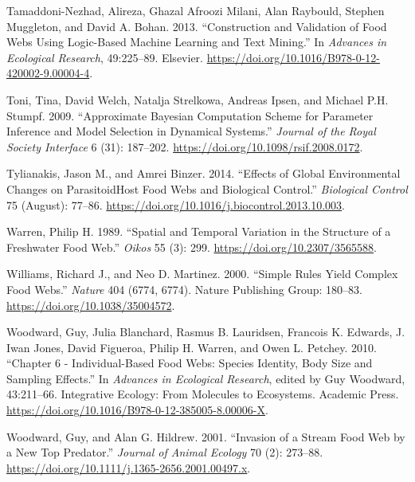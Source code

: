 \documentclass{article}
\begin{document}
\leavevmode\hypertarget{ref-tamaddoni-nezhadConstructionValidationFood2013}{}%
Tamaddoni-Nezhad, Alireza, Ghazal Afroozi Milani, Alan Raybould, Stephen
Muggleton, and David A. Bohan. 2013. ``Construction and Validation of
Food Webs Using Logic-Based Machine Learning and Text Mining.'' In
\emph{Advances in Ecological Research}, 49:225--89. Elsevier.
\url{https://doi.org/10.1016/B978-0-12-420002-9.00004-4}.

\leavevmode\hypertarget{ref-toniApproximateBayesianComputation2009}{}%
Toni, Tina, David Welch, Natalja Strelkowa, Andreas Ipsen, and Michael
P.H. Stumpf. 2009. ``Approximate Bayesian Computation Scheme for
Parameter Inference and Model Selection in Dynamical Systems.''
\emph{Journal of the Royal Society Interface} 6 (31): 187--202.
\url{https://doi.org/10.1098/rsif.2008.0172}.

\leavevmode\hypertarget{ref-tylianakisEffectsGlobalEnvironmental2014}{}%
Tylianakis, Jason M., and Amrei Binzer. 2014. ``Effects of Global
Environmental Changes on ParasitoidHost Food Webs and Biological
Control.'' \emph{Biological Control} 75 (August): 77--86.
\url{https://doi.org/10.1016/j.biocontrol.2013.10.003}.

\leavevmode\hypertarget{ref-warrenSpatialTemporalVariation1989}{}%
Warren, Philip H. 1989. ``Spatial and Temporal Variation in the
Structure of a Freshwater Food Web.'' \emph{Oikos} 55 (3): 299.
\url{https://doi.org/10.2307/3565588}.

\leavevmode\hypertarget{ref-williamsSimpleRulesYield2000}{}%
Williams, Richard J., and Neo D. Martinez. 2000. ``Simple Rules Yield
Complex Food Webs.'' \emph{Nature} 404 (6774, 6774). Nature Publishing
Group: 180--83. \url{https://doi.org/10.1038/35004572}.

\leavevmode\hypertarget{ref-woodwardChapterIndividualBasedFood2010}{}%
Woodward, Guy, Julia Blanchard, Rasmus B. Lauridsen, Francois K.
Edwards, J. Iwan Jones, David Figueroa, Philip H. Warren, and Owen L.
Petchey. 2010. ``Chapter 6 - Individual-Based Food Webs: Species
Identity, Body Size and Sampling Effects.'' In \emph{Advances in
Ecological Research}, edited by Guy Woodward, 43:211--66. Integrative
Ecology: From Molecules to Ecosystems. Academic Press.
\url{https://doi.org/10.1016/B978-0-12-385005-8.00006-X}.

\leavevmode\hypertarget{ref-woodwardInvasionStreamFood2001}{}%
Woodward, Guy, and Alan G. Hildrew. 2001. ``Invasion of a Stream Food
Web by a New Top Predator.'' \emph{Journal of Animal Ecology} 70 (2):
273--88. \url{https://doi.org/10.1111/j.1365-2656.2001.00497.x}.
\end{document}

